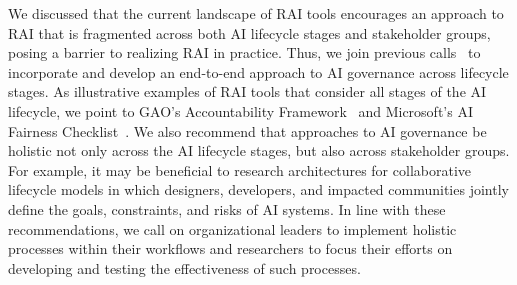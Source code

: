 We discussed that the current landscape of RAI tools encourages an approach to RAI that is fragmented across both AI lifecycle stages and stakeholder groups, posing a barrier to realizing RAI in practice.
Thus, we join previous calls~\cite{Raji2020} to incorporate and develop an end-to-end approach to AI governance across lifecycle stages.
As illustrative examples of RAI tools that consider all stages of the AI lifecycle, we point to GAO's Accountability Framework~\cite{GAO2021} and Microsoft's AI Fairness Checklist~\cite{Madaio2020}.
We also recommend that approaches to AI governance be holistic not only across the AI lifecycle stages, but also across stakeholder groups.
For example, it may be beneficial to research architectures for collaborative lifecycle models in which designers, developers, and impacted communities jointly define the goals, constraints, and risks of AI systems.
In line with these recommendations, we call on organizational leaders to implement holistic processes within their workflows and researchers to focus their efforts on developing and testing the effectiveness of such processes.


